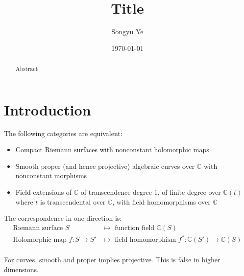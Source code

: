 \documentclass[12pt]{article}
\begin{document}
\rhead{\today}
\cfoot{\thepage}

\title{Title}

\author{Songyu Ye}
\date{\today}
\maketitle


\begin{abstract}
Abstract
\end{abstract}

\tableofcontents

\section{Introduction}
\begin{theorem}
The following categories are equivalent:
\begin{itemize}
    \item Compact Riemann surfaces with nonconstant holomorphic maps
    \item Smooth proper (and hence projective) algebraic curves over $\mathbb{C}$ with nonconstant morphisms
    \item Field extensions of $\mathbb{C}$ of transcendence degree $1$, of finite degree over $\mathbb{C}(t)$ where $t$ is transcendental over $\mathbb{C}$, with field homomorphisms over $\mathbb{C}$
\end{itemize}

The correspondence in one direction is:
\begin{align*}
    \text{Riemann surface } S &\mapsto \text{ function field } \mathbb{C}(S) \\
    \text{Holomorphic map } f: S \to S' &\mapsto \text{ field homomorphism } f^*: \mathbb{C}(S') \to \mathbb{C}(S) \\
\end{align*}
\end{theorem}

\begin{remark}
    For curves, smooth and proper implies projective. This is false in higher dimensions.
\end{remark}
\end{document}
